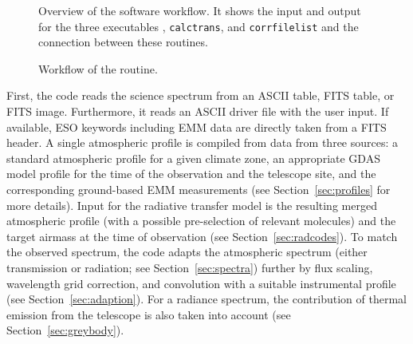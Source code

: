 \begin{figure}[ht]
\begin{center}
\caption{Overview of the software workflow. It shows the input and output for
the three executables \mf{}, {\tt calctrans}, and {\tt corrfilelist}
and the connection between these routines.}
\label{fig:mf_overview}
\end{center}
\end{figure}
\begin{figure}[ht]
\begin{center}
\caption{Workflow of the \mf{} routine.}
\label{fig:mf_detworkflow}
\end{center}
\end{figure}

First, the code reads the science spectrum from an ASCII table, FITS table, or
FITS image. Furthermore, it reads an ASCII driver file with the user input. If
available, ESO keywords including EMM data are directly taken from a FITS
header. A single atmospheric profile is compiled from data from three sources:
a standard atmospheric profile for a given climate zone, an appropriate
\ac{GDAS} model profile for the time of the observation and the telescope site,
and the corresponding ground-based \ac{EMM} measurements (see
Section~\ref{sec:profiles} for more details). Input for the radiative transfer
model is the resulting merged atmospheric profile (with a possible
pre-selection of relevant molecules) and the target airmass at the time of
observation (see Section~\ref{sec:radcodes}). To match the observed spectrum,
the code adapts the atmospheric spectrum (either transmission or radiation; see
Section~\ref{sec:spectra}) further by flux scaling, wavelength grid correction,
and convolution with a suitable instrumental profile (see
Section~\ref{sec:adaption}). For a radiance spectrum, the contribution of
thermal emission from the telescope is also taken into account (see
Section~\ref{sec:greybody}).

